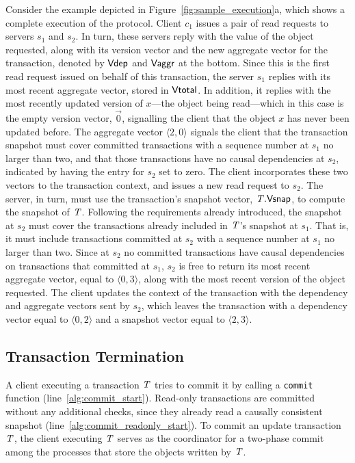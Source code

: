 Consider the example depicted in Figure~\ref{fig:sample_execution}a, which shows a complete execution of the protocol. Client $c_1$ issues a pair of read requests to servers $s_1$ and $s_2$. In turn, these servers reply with the value of the object requested, along with its version vector and the new aggregate vector for the transaction, denoted by $\mathsf{Vdep}$ and $\mathsf{Vaggr}$ at the bottom. Since this is the first read request issued on behalf of this transaction, the server $s_1$ replies with its most recent aggregate vector, stored in $\mathsf{Vtotal}$. In addition, it replies with the most recently updated version of $x$---the object being read---which in this case is the empty version vector, $\vec{0}$, signalling the client that the object $x$ has never been updated before. The aggregate vector $\langle 2, 0 \rangle$ signals the client that the transaction snapshot must cover committed transactions with a sequence number at $s_1$ no larger than two, and that those transactions have no causal dependencies at $s_2$, indicated by having the entry for $s_2$ set to zero. The client incorporates these two vectors to the transaction context, and issues a new read request to $s_2$. The server, in turn, must use the transaction's snapshot vector, $\mathit{T}.\mathsf{Vsnap}$, to compute the snapshot of $\mathit{T}$. Following the requirements already introduced, the snapshot at $s_2$ must cover the transactions already included in $\mathit{T}$'s snapshot at $s_1$. That is, it must include transactions committed at $s_2$ with a sequence number at $s_1$ no larger than two. Since at $s_2$ no committed transactions have causal dependencies on transactions that committed at $s_1$, $s_2$ is free to return its most recent aggregate vector, equal to $\langle 0, 3 \rangle$, along with the most recent version of the object requested. The client updates the context of the transaction with the dependency and aggregate vectors sent by $s_2$, which leaves the transaction with a dependency vector equal to $\langle 0, 2 \rangle$ and a snapshot vector equal to $\langle 2, 3 \rangle$.

\subsection{Transaction Termination}

A client executing a transaction $\mathit{T}$ tries to commit it by calling a {\tt commit} function (line~\ref{alg:commit_start}). Read-only transactions are committed without any additional checks, since they already read a causally consistent snapshot (line~\ref{alg:commit_readonly_start}). To commit an update transaction $\mathit{T}$, the client executing $\mathit{T}$ serves as the coordinator for a two-phase commit among the processes that store the objects written by $\mathit{T}$.


